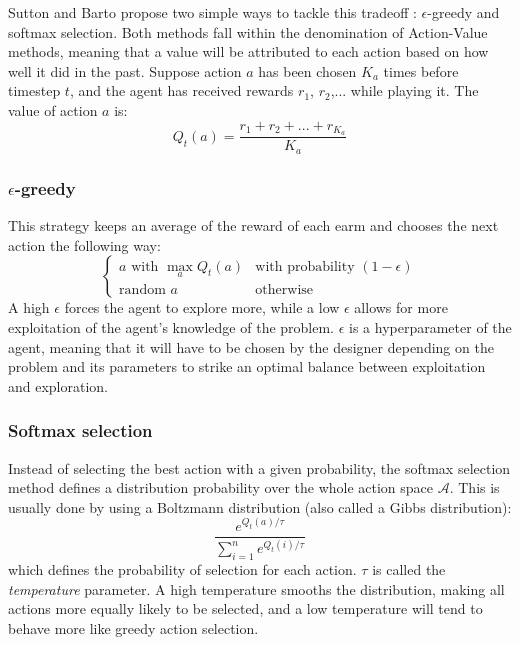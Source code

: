 Sutton and Barto \cite{suttonbarto} propose two
simple ways to tackle this tradeoff : $\epsilon$-greedy and softmax selection.
Both methods fall within the denomination of Action-Value methods, meaning
that a value will be attributed to each action based on how well it did
in the past. Suppose action $a$ has been chosen $K_a$ times before timestep
$t$, and the agent has received rewards $r_1$, $r_2$,... while playing it. 
The value of action $a$ is:
\begin{equation}
Q_t(a) = \frac{r_1 + r_2 + ... + r_{K_a}}{K_a}
	\label{eq:action-value}
\end{equation}

\subsubsection{$\epsilon$-greedy}
This strategy keeps an average of the reward of each earm and chooses the next
action the following way:
\begin{equation}\begin{cases}
	\text{$a$ with $\max\limits_aQ_t(a)$} & \text{with probability } (1-\epsilon) 
	\\
	\text{random $a$} & \text{otherwise}
\end{cases}
\label{eq:egreedy}
\end{equation}
A high $\epsilon$ forces the agent to explore more, while a low $\epsilon$
allows for more exploitation of the agent's knowledge of the problem. 
$\epsilon$ is a hyperparameter of the agent, meaning that it will have to
be chosen by the designer depending on the problem and its parameters to 
strike an optimal balance between exploitation and exploration.

\subsubsection{Softmax selection}
Instead of selecting the best action with a given probability, the 
softmax selection method defines a distribution probability over the whole
action space $\mathcal{A}$. This is usually done by using a Boltzmann distribution
(also called a Gibbs distribution):
$$ \frac{e^{Q_t(a)/\tau}}{\sum_{i=1}^{n}e^{Q_t(i)/\tau}} $$
which defines the probability of selection for each action. $\tau$ is called
the \textit{temperature} parameter. A high temperature smooths the distribution,
making all actions more equally likely to be selected, and a low temperature
will tend to behave more like greedy action selection.


